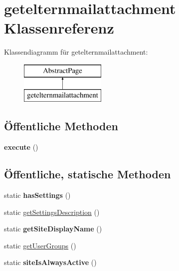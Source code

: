 \hypertarget{classgetelternmailattachment}{}\section{getelternmailattachment Klassenreferenz}
\label{classgetelternmailattachment}
Klassendiagramm für getelternmailattachment\+:\begin{figure}[H]
\begin{center}
\leavevmode
\includegraphics[height=2.000000cm]{classgetelternmailattachment}
\end{center}
\end{figure}
\subsection*{Öffentliche Methoden}
\begin{DoxyCompactItemize}
\item 
\mbox{\label{classgetelternmailattachment_a4a47c1584ac86846de6f0bb7e675cbf2}} 
{\bfseries execute} ()
\end{DoxyCompactItemize}
\subsection*{Öffentliche, statische Methoden}
\begin{DoxyCompactItemize}
\item 
\mbox{\label{classgetelternmailattachment_a021b62a3f6ad4a5ca1e72bf5e8a90c45}} 
static {\bfseries has\+Settings} ()
\item 
static \mbox{\hyperlink{classgetelternmailattachment_ae81c9e4c7a2ce123cd24500da563fbaa}{get\+Settings\+Description}} ()
\item 
\mbox{\label{classgetelternmailattachment_a096fd3c7d7209c1961065ab15e821aaa}} 
static {\bfseries get\+Site\+Display\+Name} ()
\item 
static \mbox{\hyperlink{classgetelternmailattachment_a9abd1214faa4f57f3b68a4089ff9a660}{get\+User\+Groups}} ()
\item 
\mbox{\label{classgetelternmailattachment_a244f24e3c427ca1155eb150aa27cf5bd}} 
static {\bfseries site\+Is\+Always\+Active} ()
\end{DoxyCompactItemize}
